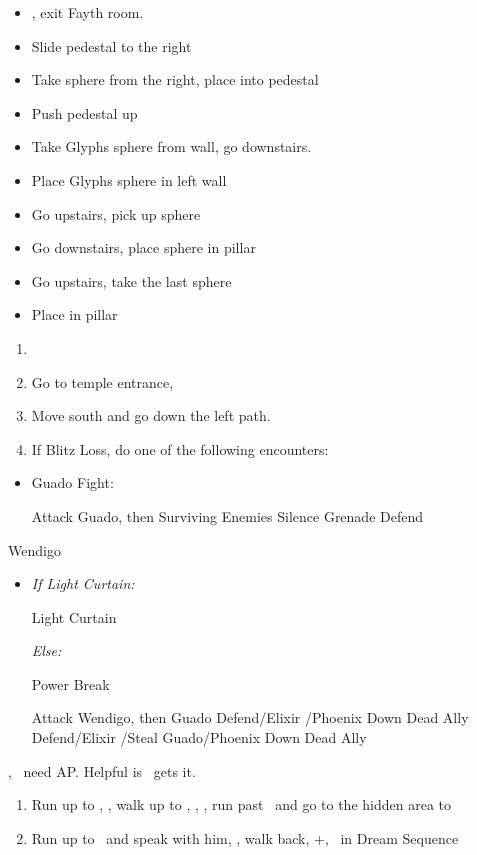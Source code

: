 \begin{trial}
  \begin{itemize}
    \item \save, exit Fayth room.
    \item Slide pedestal to the right
    \item Take sphere from the right, place into pedestal
    \item Push pedestal up
    \item Take Glyphs sphere from wall, go downstairs.
    \item Place Glyphs sphere in left wall
    \item Go upstairs, pick up sphere
    \item Go downstairs, place sphere in pillar
    \item Go upstairs, take the last sphere
    \item Place in pillar
  \end{itemize}
\end{trial}
\begin{enumerate}[resume]
  \item \formation{\rikku}{\tidus}{\yuna}
  \item Go to temple entrance, \sd
  \item Move south and go down the left path.
  \item If Blitz Loss, do one of the following encounters:
\end{enumerate}
\begin{encounters}
  \begin{itemize}
    \item Guado Fight:
          \begin{itemize}
            \tidusf Attack Guado, then Surviving Enemies
            \rikkuf Silence Grenade
            \yunaf Defend
          \end{itemize}
  \end{itemize}
\end{encounters}
\begin{battle}[18000]{Wendigo}
  \begin{itemize}
    \tidusf Haste \tidus
    \tidusf Switch Weapon to Brotherhood
    \tidusf Attack Guado B (Top One)
    \item \textit{If Light Curtain:}
    \begin{itemize}
	    \rikkuf Light Curtain \tidus
    \end{itemize}
    \textit{Else:}
    \begin{itemize}
    		\switch{\rikku}{\auron}
    		\auronf Power Break
	\end{itemize}
    \tidusf Attack Wendigo, then Guado
    \yunaf Defend/Elixir \tidus/Phoenix Down Dead Ally
    \rikkuf Defend/Elixir \tidus/Steal Guado/Phoenix Down Dead Ally
    \switch{\yuna}{\lulu}
  \end{itemize}
\yuna, \tidus\ need AP. Helpful is \lulu\ gets it.
\end{battle}
\begin{enumerate}[resume]
  \item Run up to \rikku, \sd, walk up to \yuna, \sd, \save, run past \kimahri\ and go to the hidden area to 
  \item Run up to \auron\ and speak with him, \sd, walk back, \cs+\skippablefmv[1:00], \sd\ in Dream Sequence
\end{enumerate}